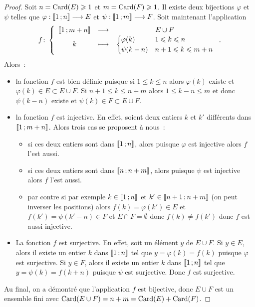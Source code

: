 \begin{proof}
  Soit \(n = \operatorname{Card}(E)\geqslant 1\) et \(m = \operatorname{Card}(F)\geqslant 1\). Il existe
  deux bijections \(\varphi\) et \(\psi\) telles que
  \(\varphi:\mathopen{\llbracket}1\mathclose{}\mathpunct{};n\mathclose{\rrbracket} \longrightarrow{} E\) et
  \(\psi:\mathopen{\llbracket}1\mathclose{}\mathpunct{};m\mathclose{\rrbracket} \longrightarrow{} F\). Soit maintenant
  l'application
  \begin{equation}
    f\colon\left\{\begin{array}{ccc}\mathopen{\llbracket}1\mathclose{}\mathpunct{};m + n\mathclose{\rrbracket} & \longrightarrow &E\cup F\\k & \longmapsto & \begin{cases}
        \varphi(k) & 1\leqslant k\leqslant n \\ \psi(k - n) & n + 1\leqslant
    k\leqslant m + n\end{cases}\end{array}\right..
  \end{equation}
  Alors~:
  \begin{itemize}
    \item la fonction \(f\) est bien définie puisque si \(1\leqslant k \leqslant
      n\) alors \(\varphi(k)\) existe et \(\varphi(k)\in E\subset E\cup F\). Si
      \(n + 1\leqslant k \leqslant n + m\) alors \(1\leqslant k - n \leqslant
      m\) et donc \(\psi(k - n)\) existe et \(\psi(k)\in F\subset E\cup F\).
    \item la fonction \(f\) est injective. En effet, soient deux entiers \(k\)
      et \(k'\) différents  dans \(\mathopen{\llbracket}1\mathclose{}\mathpunct{};m + n\mathclose{\rrbracket}\). Alors trois
      cas se proposent à nous~:
      \begin{itemize}
        \item si ces deux entiers sont dans \(\mathopen{\llbracket}1\mathclose{}\mathpunct{};n\mathclose{\rrbracket}\), alors
          puisque \(\varphi\) est injective alors \(f\) l'est aussi.
        \item si ces deux entiers sont dans \(\mathopen{\llbracket}n\mathclose{}\mathpunct{};n + m\mathclose{\rrbracket}\),
          alors puisque \(\psi\) est injective alors \(f\) l'est aussi.
        \item par contre si par exemple \(k\in\mathopen{\llbracket}1\mathclose{}\mathpunct{};n\mathclose{\rrbracket}\) et
          \(k'\in\mathopen{\llbracket}n + 1\mathclose{}\mathpunct{};n + m\mathclose{\rrbracket}\) (on peut inverser les
          positions) alors \(f(k) = \varphi(k')\in E\) et \(f(k') =
          \psi(k'-n)\in F\) et \(E\cap F = \emptyset\) donc \(f(k)\neq f(k')\)
          donc \(f\) est aussi injective.
      \end{itemize}
    \item La fonction \(f\) est surjective. En effet, soit un élément \(y\) de
      \(E\cup F\). Si \(y\in E\), alors il existe un entier \(k\) dans
      \(\mathopen{\llbracket}1\mathclose{}\mathpunct{};n\mathclose{\rrbracket}\) tel que \(y = \varphi(k) = f(k)\) puisque
      \(\varphi\) est surjective. Si \(y\in F\), alors il existe un entier \(k\)
      dans \(\mathopen{\llbracket}1\mathclose{}\mathpunct{};n\mathclose{\rrbracket}\) tel que \(y = \psi(k) = f(k + n)\)
      puisque \(\psi\) est surjective. Donc \(f\) est surjective.
  \end{itemize}
  Au final, on a démontré que l'application \(f\) est bijective, donc \(E\cup
  F\) est un ensemble fini avec \(\operatorname{Card}(E\cup F) = n + m = \operatorname{Card}(E)+\operatorname{Card}(F)\).
\end{proof}

